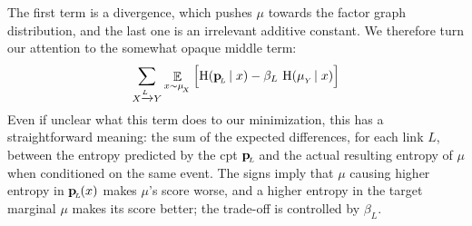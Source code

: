 \documentclass{article}
\newcommand{\bp}[1][L]{\mat{p}_{\!_#1\!}}
\newcommand{\sfM}{\mathsf M}
\newcommand{\alle}[1][L]{_{ X \xrightarrow{\!\!#1} Y }}
\begin{document}
	
	The first term is a divergence, which pushes $\mu$ towards the factor graph distribution, and the last one is an irrelevant additive constant. We therefore turn our attention to the somewhat opaque middle term:
	\[ \sum\alle \E_{x \sim \mu_{\!_X}} \Big[ \H(\bp \mid x) - \beta_L \ \H(\mu_{_Y}\! \mid x) \Big] 
	  \]
	Even if unclear what this term does to our minimization, this has a straightforward meaning: the sum of the expected differences, for each link $L$, between the entropy predicted by the cpt $\bp$ and the actual resulting entropy of $\mu$ when conditioned on the same event.
	The signs imply that $\mu$ causing higher entropy in $\bp(x)$ makes $\mu$'s score worse, and a higher entropy in the target marginal $\mu$ makes its score better; the trade-off is controlled by $\beta_L$.
	
	
	

	
\end{document}

